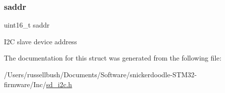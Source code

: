 \subsubsection{\texorpdfstring{saddr}{saddr}}
{\footnotesize\ttfamily uint16\+\_\+t saddr}

I2C slave device address 

The documentation for this struct was generated from the following file\+:\begin{DoxyCompactItemize}
\item 
/\+Users/russellbush/\+Documents/\+Software/snickerdoodle-\/\+S\+T\+M32-\/firmware/\+Inc/\mbox{\hyperlink{sd__i2c_8h}{sd\+\_\+i2c.\+h}}\end{DoxyCompactItemize}
